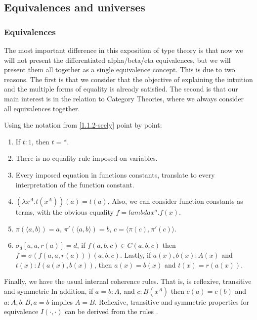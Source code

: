 \subsection{Equivalences and universes}
\subsubsection{Equivalences}

The most important difference in this exposition of type theory is that now we will not present the differentiated alpha/beta/eta equivalences, but we will present them all together as a single equivalence concept. This is due to two reasons. The first is that we consider that the objective of explaining the intuition and the multiple forms of equality is already satisfied. The second is that our main interest is in the relation to Category Theories, where we always consider all equivalences together.


\begin{definition} \label{def:ml-equality}
  Using the notation from \ref{1.1.2-seely} point by point:
  \begin{enumerate}
  \item If $t:1$, then $t=*$.
  \item There is no equality rule imposed on variables.
  \item Every imposed equation in functions constants, translate to every interpretation of the function constant.
  \item $(\lambda x^A.t(x^A))(a) =  t(a)$, Also, we can consider function constants as terms, with the obvious equality $f = lambda x^a.f(x)$.
  \item $\pi(\langle a,b\rangle) = a$,  $\pi'(\langle a, b\rangle) = b$, $c=\langle \pi(c),\pi'(c)\rangle$.
  \item $\sigma_d[a,a,r(a)]=d$, if $f(a,b,c)\in C(a,b,c)$ then $f=\sigma(f(a,a,r(a)))(a,b,c)$. Lastly, if $a(x), b(x):A(x)$ and $t(x) : I(a(x),b(x))$, then $a(x)=b(x)$ and $t(x)=r(a(x))$.
  \end{enumerate}

  Finally, we have the  usual internal coherence rules. That is, is reflexive, transitive and symmetric In addition, if $a=b : A$, and $c:B(x^A)$ then $c(a)=c(b)$ and $a:A, b:B, a=b$ implies $A=B$. Reflexive, transitive and symmetric properties for equivalence $I(\cdot, \cdot)$ can be derived from the rules \cite[1.3]{seely1984locally}.
\end{definition}

